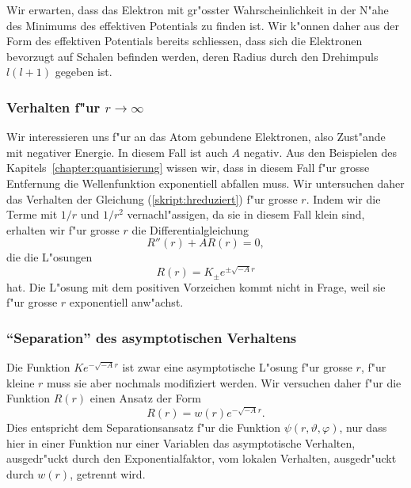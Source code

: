 Wir erwarten, dass das Elektron mit gr"osster Wahrscheinlichkeit
in der N"ahe des Minimums des effektiven Potentials zu finden ist.
Wir k"onnen daher aus der Form des effektiven Potentials bereits
schliessen, dass sich die Elektronen bevorzugt auf Schalen befinden
werden, deren Radius durch den Drehimpuls $l(l+1)$ gegeben ist.

\subsubsection{Verhalten f"ur $r\to\infty$}
Wir interessieren uns f"ur an das Atom gebundene Elektronen, also
Zust"ande mit negativer Energie.
In diesem Fall ist auch $A$ negativ.
Aus den Beispielen des Kapitels~\ref{chapter:quantisierung} wissen wir,
dass in diesem Fall f"ur grosse Entfernung die Wellenfunktion exponentiell
abfallen muss.
Wir untersuchen daher das Verhalten der Gleichung (\ref{skript:hreduziert})
f"ur grosse $r$.
Indem wir die Terme mit $1/r$ und $1/r^2$ vernachl"assigen, da sie in
diesem Fall klein sind, erhalten wir f"ur grosse $r$ die Differentialgleichung
\[
R''(r)+AR(r)=0,
\]
die die L"osungen
\[
R(r)=K_\pm e^{\pm\sqrt{-A}r}
\]
hat.
Die L"osung mit dem positiven Vorzeichen kommt nicht in Frage, weil
sie f"ur grosse $r$ exponentiell anw"achst.

\subsubsection{``Separation'' des asymptotischen Verhaltens}
Die Funktion $Ke^{-\sqrt{-A}r}$ ist zwar eine asymptotische L"osung
f"ur grosse $r$, f"ur kleine $r$ muss sie aber nochmals modifiziert
werden.
Wir versuchen daher f"ur die Funktion $R(r)$ einen Ansatz der Form
\begin{equation}
R(r)=w(r)e^{-\sqrt{-A}r}.
\label{skript:Ransatz}
\end{equation}
Dies entspricht dem Separationsansatz f"ur die Funktion
$\psi(r,\vartheta,\varphi)$, nur dass hier in einer Funktion nur einer
Variablen das asymptotische Verhalten, ausgedr"uckt durch den
Exponentialfaktor, vom lokalen Verhalten, ausgedr"uckt durch $w(r)$,
getrennt wird.

